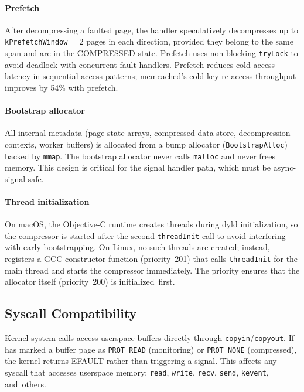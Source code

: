 \paragraph{Prefetch}
After decompressing a faulted page, the handler speculatively
decompresses up to \texttt{kPrefetchWindow} = 2 pages in each
direction, provided they belong to the same span and are in the
COMPRESSED state.  Prefetch uses non-blocking \texttt{tryLock} to
avoid deadlock with concurrent fault handlers.  Prefetch reduces
cold-access latency in sequential access patterns; memcached's cold
key re-access throughput improves by 54\% with prefetch.

\paragraph{Bootstrap allocator}
All \sys internal metadata (page state arrays, compressed data store,
decompression contexts, worker buffers) is allocated from a bump
allocator (\texttt{BootstrapAlloc}) backed by \texttt{mmap}.  The
bootstrap allocator never calls \texttt{malloc} and never frees memory.
This design is critical for the signal handler path, which must
be async-signal-safe.

\paragraph{Thread initialization}
On macOS, the Objective-C runtime creates threads during dyld
initialization, so the compressor is started after the second
\texttt{threadInit} call to avoid interfering with early
bootstrapping.  On Linux, no such threads are created; instead,
\sys registers a GCC constructor function (priority~201) that calls
\texttt{threadInit} for the main thread and starts the compressor
immediately.  The priority ensures that the allocator itself
(priority~200) is initialized~first.

\subsection{Syscall Compatibility}
\label{sec:impl:syscall}

Kernel system calls access userspace buffers directly through
\texttt{copyin}/\texttt{copyout}.  If \sys has marked a buffer page
as \texttt{PROT\_READ} (monitoring) or \texttt{PROT\_NONE}
(compressed), the kernel returns EFAULT rather than triggering a
signal.  This affects any syscall that accesses userspace memory:
\texttt{read}, \texttt{write}, \texttt{recv}, \texttt{send},
\texttt{kevent}, and~others.

